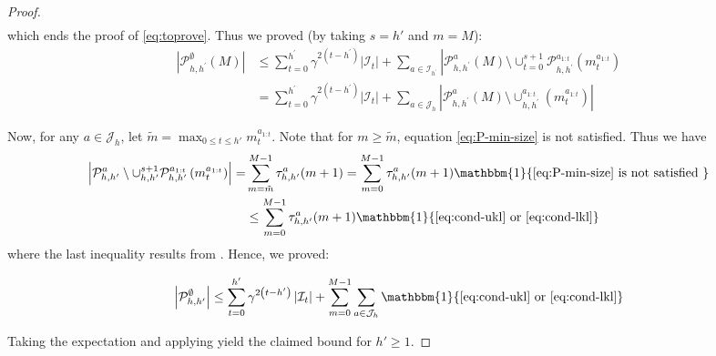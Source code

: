 \begin{proof}
\begin{align*}
	\end{align*}
	which ends the proof of \eqref{eq:toprove}. Thus we proved (by taking $s=h'$ and $m=M$):
	\begin{equation*}
	\begin{aligned}\left|\mathcal{P}_{h, h^{\prime}}^{\emptyset}(M)\right| & \leq \sum_{t=0}^{h^{\prime}} \gamma^{2\left(t-h^{\prime}\right)}\left|\mathcal{I}_{t}\right|+\sum_{a \in \mathcal{I}_{h^{\prime}}}\left|\mathcal{P}_{h, h^{\prime}}^{a}(M) \setminus \cup_{t=0}^{s+1} \mathcal{P}_{h, h^{\prime}}^{a_{1 : t}}\left(m_{t}^{a_{1 : t}}\right)\right.\\ &=\sum_{t=0}^{h^{\prime}} \gamma^{2\left(t-h^{\prime}\right)}\left|\mathcal{I}_{t}\right|+\sum_{a \in \mathcal{J}_{h}}\left|\mathcal{P}_{h, h^{\prime}}^{a}(M) \setminus \cup_{h, h^{\prime}}^{a_{1 : t}}\left(m_{t}^{a_{1 : t}}\right)\right| \end{aligned}
	\end{equation*}
	
	Now, for any $a\in \mathcal{J}_h$, let $\tilde{m} = \max_{0\leq t\leq h'} m_t^{a_{1:t}}$. Note that for $m\geq \tilde{m}$, equation \eqref{eq:P-min-size} is not satisfied. Thus we have
	\begin{equation*}
	\begin{aligned}
	\left|\mathcal{P}_{h, h^{\prime}}^{a} \setminus \cup_{h, h^{\prime}}^{s+1} \mathcal{P}_{h, h^{\prime}}^{a_{1 : t}}\left(m_{t}^{a_{1 : t}}\right)\right|=&\sum_{m=\tilde{m}}^{M-1} \tau_{h, h^{\prime}}^{a}(m+1)=\sum_{m=0}^{M-1} \tau_{h, h^{\prime}}^{a}(m+1) \mathbbm{1}\{\eqref{eq:P-min-size} \text { is not satisfied }\} \\ & \leq \sum_{m=0}^{M-1} \tau_{h, h^{\prime}}^{a}(m+1) \mathbbm{1}\{\eqref{eq:cond-ukl} \text { or }\eqref{eq:cond-lkl}\} \end{aligned}
	\end{equation*}
	where the last inequality results from . Hence, we proved:
	
	\begin{equation*}
	\left|\mathcal{P}_{h, h^{\prime}}^{\emptyset}\right| \leq \sum_{t=0}^{h^{\prime}} \gamma^{2\left(t-h^{\prime}\right)}\left|\mathcal{I}_{t}\right|+\sum_{m=0}^{M-1} \sum_{a \in \mathcal{J}_{h}} \mathbbm{1}\{\eqref{eq:cond-ukl}\text{ or }\eqref{eq:cond-lkl}\}
	\end{equation*}
	
	Taking the expectation and applying  yield the claimed bound for $h'\geq 1$.
	

\end{proof}
